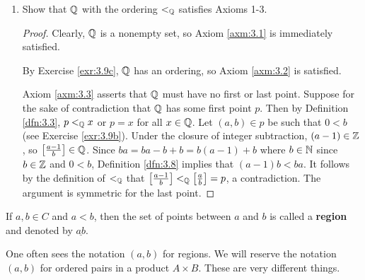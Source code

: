\documentclass[../main.tex]{subfiles}
\begin{document}
\begin{exercise}
\begin{enumerate}[label={\alph*)},ref={\thetheorem\alph*}]
\begin{proof}
            To prove that $\lQ$ is transitive, it will suffice to show that for all $p,q,r\in\Q$, if $p\lQ q$ and $q\lQ r$, then $p\lQ r$. Let $p,q,r$ be arbitrary elements of $\Q$ for which it is true that $p\lQ q$ and $q\lQ r$, let $(a,b)\in p$ be such that $0<b$, let $(c,d)\in q$ be such that $0<d$, and let $(e,f)\in r$ such that $0<f$. By the definition of $\lQ$, we have $ad<bc$ and $cf<de$. Since $0<f$ and $0<b$, we can multiply both sides of the inequalities by $b$ or $f$ without affecting the truth of the statement (see Script \ref{sct:0}). Thus, we may create the inequalities $adf<bcf$ and $bcf<bde$. So $adf<bde$ by Definition \ref{dfn:3.1}, implying that $af<be$ by the cancellation law (which we may use since $0<d$). It follows by the definition of $\lQ$ that $p\lQ r$.
        \end{proof}
        \item \label{exr:3.9d}Show that $\Q$ with the ordering $\lQ$ satisfies Axioms 1-3.
        \begin{proof}
            Clearly, $\Q$ is a nonempty set, so Axiom \ref{axm:3.1} is immediately satisfied.\par
            By Exercise \ref{exr:3.9c}, $\Q$ has an ordering, so Axiom \ref{axm:3.2} is satisfied.\par
            Axiom \ref{axm:3.3} asserts that $\Q$ must have no first or last point. Suppose for the sake of contradiction that $\Q$ has some first point $p$. Then by Definition \ref{dfn:3.3}, $p<_{\mathbb{Q}} x$ or $p=x$ for all $x\in\mathbb{Q}$. Let $(a,b)\in p$ be such that $0<b$ (see Exercise \ref{exr:3.9b}). Under the closure of integer subtraction, $(a-1)\in\mathbb{Z}$, so $\left[ \frac{a-1}{b} \right]\in\mathbb{Q}$. Since $ba=ba-b+b=b(a-1)+b$ where $b\in\mathbb{N}$ since $b\in\mathbb{Z}$ and $0<b$, Definition \ref{dfn:3.8} implies that $(a-1)b<ba$. It follows by the definition of $\lQ$ that $\left[ \frac{a-1}{b} \right]<_{\mathbb{Q}}\left[ \frac{a}{b} \right]=p$, a contradiction. The argument is symmetric for the last point.
        \end{proof}
    \end{enumerate}
\end{exercise}

\begin{definition}\label{dfn:3.10}
    If $a,b\in C$ and $a<b$, then the set of points between $a$ and $b$ is called a \textbf{region} and denoted by $\underline{ab}$.
\end{definition}

\begin{remark}\label{rmk:3.11}
    One often sees the notation $(a,b)$ for regions. We will reserve the notation $(a,b)$ for ordered pairs in a product $A\times B$. These are very different things.
\end{remark}
\end{document}
